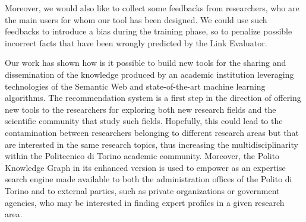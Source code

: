 \documentclass[%
    corpo=13.5pt,
    twoside,
    oldstyle,
    tipotesi=magistrale,
    greek,
    evenboxes
]{toptesi}
\begin{document}
Moreover, we would also like to collect some feedbacks from researchers,
who are the main users for whom our tool has been designed.
We could use such feedbacks to introduce a bias during the training phase, so
to penalize possible incorrect facts that have been wrongly predicted by the
Link Evaluator.

Our work has shown how is it possible to build new tools for the
sharing and dissemination of the knowledge produced by an academic institution
leveraging technologies of the Semantic Web and state-of-the-art machine
learning algorithms.
The recommendation system is a first step in the direction of
offering new tools to the researchers for exploring both new research fields
and the scientific community that study such fields.
Hopefully, this could lead to the contamination between researchers belonging
to different research areas but that are interested in the same research
topics, thus increasing the multidisciplinarity within the Politecnico di
Torino academic community.
Moreover, the Polito Knowledge Graph in its enhanced version is used to empower
as an expertise search engine made available to both the administration offices
of the Polito di Torino and to external parties, such as private organizations
or government agencies, who may be interested in finding expert profiles in a
given research area.




\end{document}
